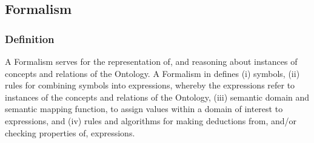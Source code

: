 \documentclass[10pt, final, conference, compsocconf]{IEEEtran}
\begin{document}

\subsection{Formalism}\label{s:components:formalism}

\subsubsection{Definition} A Formalism serves for the representation of, and reasoning about instances of concepts and relations of the Ontology. A Formalism in  defines (i) symbols, (ii) rules for combining symbols into expressions, whereby the expressions refer to instances of the concepts and relations of the Ontology, (iii) semantic domain and semantic mapping function, to assign values within a domain of interest to expressions, and (iv) rules and algorithms for making deductions from, and/or checking properties of, expressions. 
\end{document}

